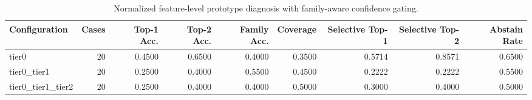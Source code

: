 \begin{table}[t]
\centering
\caption{Normalized feature-level prototype diagnosis with family-aware confidence gating.}
\label{tab:dice_stressor_hierarchical_diagnosis}
\footnotesize
\begin{tabular}{lrrrrrrrr}
\toprule
Configuration & Cases & Top-1 Acc. & Top-2 Acc. & Family Acc. & Coverage & Selective Top-1 & Selective Top-2 & Abstain Rate \\
\midrule
tier0 & 20 & 0.4500 & 0.6500 & 0.4000 & 0.3500 & 0.5714 & 0.8571 & 0.6500 \\
tier0_tier1 & 20 & 0.2500 & 0.4000 & 0.5500 & 0.4500 & 0.2222 & 0.2222 & 0.5500 \\
tier0_tier1_tier2 & 20 & 0.2500 & 0.4000 & 0.4000 & 0.5000 & 0.3000 & 0.4000 & 0.5000 \\
\bottomrule
\end{tabular}

\end{table}
